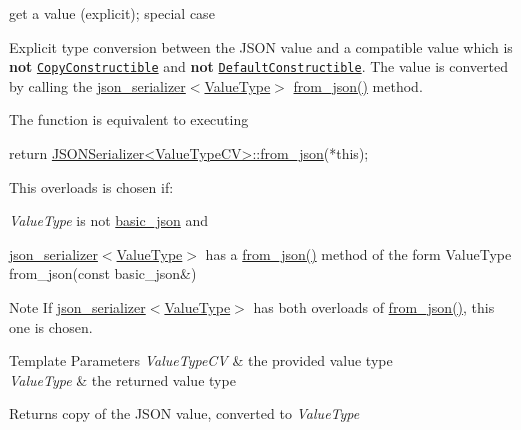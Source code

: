 get a value (explicit); special case 

Explicit type conversion between the J\+S\+ON value and a compatible value which is {\bfseries not} \href{http://en.cppreference.com/w/cpp/concept/CopyConstructible}{\tt Copy\+Constructible} and {\bfseries not} \href{http://en.cppreference.com/w/cpp/concept/DefaultConstructible}{\tt Default\+Constructible}. The value is converted by calling the \hyperlink{classnlohmann_1_1basic__json_a7768841baaaa7a21098a401c932efaff}{json\+\_\+serializer$<$\+Value\+Type$>$} {\ttfamily \hyperlink{namespacenlohmann_1_1detail_a8b99ec9b29f3f20a18fc4281fb784e49}{from\+\_\+json()}} method.

The function is equivalent to executing 
\begin{DoxyCode}
\textcolor{keywordflow}{return} \hyperlink{namespacenlohmann_1_1anonymous__namespace_02json_8hpp_03_a69afe041fa2aeac2239b65ae88b64af8}{JSONSerializer<ValueTypeCV>::from\_json}(*\textcolor{keyword}{this});
\end{DoxyCode}


This overloads is chosen if\+:
\begin{DoxyItemize}
\item {\itshape Value\+Type} is not \hyperlink{classnlohmann_1_1basic__json}{basic\+\_\+json} and
\item \hyperlink{classnlohmann_1_1basic__json_a7768841baaaa7a21098a401c932efaff}{json\+\_\+serializer$<$\+Value\+Type$>$} has a {\ttfamily \hyperlink{namespacenlohmann_1_1detail_a8b99ec9b29f3f20a18fc4281fb784e49}{from\+\_\+json()}} method of the form {\ttfamily Value\+Type from\+\_\+json(const basic\+\_\+json\&)}
\end{DoxyItemize}

\begin{DoxyNote}{Note}
If \hyperlink{classnlohmann_1_1basic__json_a7768841baaaa7a21098a401c932efaff}{json\+\_\+serializer$<$\+Value\+Type$>$} has both overloads of {\ttfamily \hyperlink{namespacenlohmann_1_1detail_a8b99ec9b29f3f20a18fc4281fb784e49}{from\+\_\+json()}}, this one is chosen.
\end{DoxyNote}

\begin{DoxyTemplParams}{Template Parameters}
{\em Value\+Type\+CV} & the provided value type \\
\hline
{\em Value\+Type} & the returned value type\\
\hline
\end{DoxyTemplParams}
\begin{DoxyReturn}{Returns}
copy of the J\+S\+ON value, converted to {\itshape Value\+Type} 
\end{DoxyReturn}


